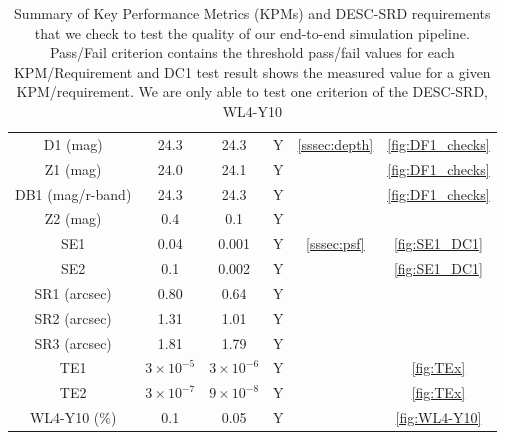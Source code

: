 \documentclass[\docopts]{\docclass}
\begin{document}
\begin{table}
\begin{tabular}{|c|c|c|c|c|c|}
D1 (mag) & 24.3 & 24.3 & Y & \ref{sssec:depth} & \ref{fig:DF1_checks}\\
Z1 (mag) & 24.0 & 24.1 & Y & & \ref{fig:DF1_checks}\\
DB1 (mag/r-band) & 24.3 & 24.3 & Y &  & \ref{fig:DF1_checks}\\
Z2 (mag) & 0.4 & 0.1 & Y &  & \\
\hline
SE1 & 0.04 & 0.001 & Y & \ref{sssec:psf} & \ref{fig:SE1_DC1}\\
SE2 & 0.1 & 0.002 & Y & & \ref{fig:SE1_DC1}\\
SR1 (arcsec) & 0.80 & 0.64 & Y & & \\
SR2 (arcsec) & 1.31 & 1.01 & Y & & \\
SR3 (arcsec) & 1.81 & 1.79 & Y & &\\
TE1 & $3 \times 10^{-5}$ & $3\times 10^{-6}$ & Y & & \ref{fig:TEx}\\
TE2 & $3 \times 10^{-7}$ & $9\times 10^{-8}$ & Y & & \ref{fig:TEx}\\
\hline
WL4-Y10 (\%) & 0.1 & 0.05 & Y & & \ref{fig:WL4-Y10}\\
\end{tabular}
\caption{Summary of Key Performance Metrics (KPMs) and DESC-SRD requirements that we check to test the quality of our end-to-end simulation pipeline. Pass/Fail criterion contains the threshold pass/fail values for each KPM/Requirement and DC1 test result shows the measured value for a given KPM/requirement. We are only able to test one criterion of the DESC-SRD, WL4-Y10} %
\label{tab:kpm_table}
\end{table}
\end{document}
